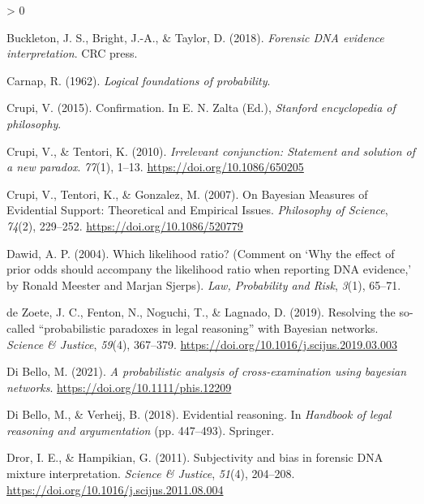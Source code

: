 \documentclass[
  10pt,
  dvipsnames,enabledeprecatedfontcommands]{scrartcl}
\newlength{\cslhangindent}
\newenvironment{CSLReferences}[2] %
 {%
  \setlength{\parindent}{0pt}
  \ifodd #1 \everypar{\setlength{\hangindent}{\cslhangindent}}\ignorespaces\fi
  \ifnum #2 > 0
  \setlength{\parskip}{#2\baselineskip}
  \fi
 }%
 {}
\begin{document}
\begin{CSLReferences}{1}{0}
\leavevmode\hypertarget{ref-buckleton2018forensic}{}%
Buckleton, J. S., Bright, J.-A., \& Taylor, D. (2018). \emph{Forensic
DNA evidence interpretation}. CRC press.

\leavevmode\hypertarget{ref-carnap1962logical}{}%
Carnap, R. (1962). \emph{Logical foundations of probability}.

\leavevmode\hypertarget{ref-crupi2015confirmation}{}%
Crupi, V. (2015). Confirmation. In E. N. Zalta (Ed.), \emph{Stanford
encyclopedia of philosophy}.

\leavevmode\hypertarget{ref-CrupiTentori2010irrelevant}{}%
Crupi, V., \& Tentori, K. (2010). \emph{Irrelevant conjunction:
Statement and solution of a new paradox}. \emph{77}(1), 1--13.
\url{https://doi.org/10.1086/650205}

\leavevmode\hypertarget{ref-crupi2007BayesianMeasuresEvidential}{}%
Crupi, V., Tentori, K., \& Gonzalez, M. (2007). On {Bayesian Measures}
of {Evidential Support}: {Theoretical} and {Empirical Issues}.
\emph{Philosophy of Science}, \emph{74}(2), 229--252.
\url{https://doi.org/10.1086/520779}

\leavevmode\hypertarget{ref-dawid2004likelihood}{}%
Dawid, A. P. (2004). Which likelihood ratio? (Comment on {`{W}hy the
effect of prior odds should accompany the likelihood ratio when
reporting {DNA} evidence,'} by {R}onald {M}eester and {M}arjan
{S}jerps). \emph{Law, Probability and Risk}, \emph{3}(1), 65--71.

\leavevmode\hypertarget{ref-dezoete2019ResolvingSocalledProbabilistic}{}%
de Zoete, J. C., Fenton, N., Noguchi, T., \& Lagnado, D. (2019).
Resolving the so-called {``probabilistic paradoxes in legal reasoning''}
with {Bayesian} networks. \emph{Science \& Justice}, \emph{59}(4),
367--379. \url{https://doi.org/10.1016/j.scijus.2019.03.003}

\leavevmode\hypertarget{ref-Bello2021probabilisticCrossexamination}{}%
Di Bello, M. (2021). \emph{A probabilistic analysis of cross-examination
using bayesian networks}. \url{https://doi.org/10.1111/phis.12209}

\leavevmode\hypertarget{ref-di2018evidential}{}%
Di Bello, M., \& Verheij, B. (2018). Evidential reasoning. In
\emph{Handbook of legal reasoning and argumentation} (pp. 447--493).
Springer.

\leavevmode\hypertarget{ref-Dror2011subjectivity}{}%
Dror, I. E., \& Hampikian, G. (2011). Subjectivity and bias in forensic
{DNA} mixture interpretation. \emph{Science {\&} Justice}, \emph{51}(4),
204--208. \url{https://doi.org/10.1016/j.scijus.2011.08.004}


\end{CSLReferences}
\end{document}
